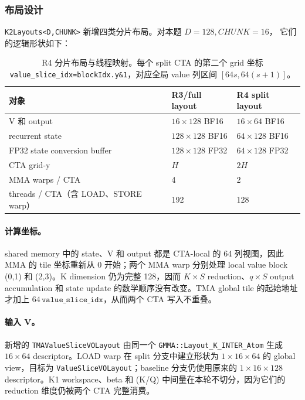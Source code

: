 \documentclass[11pt,a4paper,fontset=none]{ctexart}
\newcommand{\code}[1]{\texttt{#1}}
\begin{document}
\subsubsection{布局设计}

\code{K2Layouts<D,CHUNK>} 新增四类分片布局。对本题 \(D=128,CHUNK=16\)，
它们的逻辑形状如下：

\begin{table}[htbp]
\centering
\small
\begin{tabular}{l l l}
\toprule
对象 & R3/full layout & R4 split layout \\
\midrule
V 和 output & \(16\times128\) BF16 & \(16\times64\) BF16 \\
recurrent state & \(128\times128\) BF16 & \(64\times128\) BF16 \\
FP32 state conversion buffer & \(128\times128\) FP32 & \(64\times128\) FP32 \\
CTA grid-y & \(H\) & \(2H\) \\
MMA warps / CTA & 4 & 2 \\
threads / CTA（含 LOAD、STORE warp）& 192 & 128 \\
\bottomrule
\end{tabular}
\caption{R4 分片布局与线程映射。每个 split CTA 的第二个 grid 坐标
\code{value\_slice\_idx=blockIdx.y\&1}，对应全局 value 列区间
\([64s,64(s+1)]\)。}
\end{table}

\paragraph{计算坐标。}shared memory 中的 state、V 和 output 都是 CTA-local
的 64 列视图，因此 MMA 的 tile 坐标重新从 0 开始；两个 MMA warp 分别处理
local value block (0,1) 和 (2,3)。K dimension 仍为完整 128，因而
\(K\times S\) reduction、\(q\times S\) output accumulation 和 state update
的数学顺序没有改变。TMA global tile 的起始地址才加上
\(64\,\code{value\_slice\_idx}\)，从而两个 CTA 写入不重叠。

\paragraph{输入 V。}新增的 \code{TMAValueSliceVOLayout} 由同一个
\code{GMMA::Layout\_K\_INTER\_Atom} 生成 \(16\times64\) descriptor。LOAD warp
在 split 分支中建立形状为 \(1\times16\times64\) 的 global view，目标为
\code{ValueSliceVOLayout}；baseline 分支仍使用原来的 \(1\times16\times128\)
descriptor。K1 workspace、beta 和 (K/Q) 中间量在本轮不切分，因为它们的
reduction 维度仍被两个 CTA 完整消费。
\end{document}
